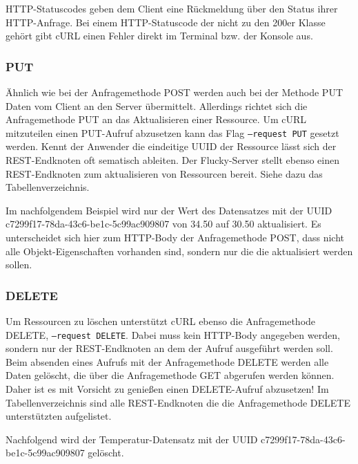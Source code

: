 HTTP-Statuscodes geben dem Client eine Rückmeldung über den Status ihrer HTTP-Anfrage. Bei einem HTTP-Statuscode der nicht zu den 200er Klasse gehört gibt cURL einen Fehler direkt im Terminal bzw. der Konsole aus.

\subsubsection{PUT}%
\label{sec:rest.ansteuern.put}
Ähnlich wie bei der Anfragemethode POST werden auch bei der Methode PUT Daten vom Client an den Server übermittelt. Allerdings richtet sich die Anfragemethode PUT an das Aktualisieren einer Ressource. Um cURL mitzuteilen einen PUT-Aufruf abzusetzen kann das Flag \texttt{--request PUT} gesetzt werden. Kennt der Anwender die eindeitige UUID der Ressource lässt sich der REST-Endknoten oft sematisch ableiten. Der Flucky-Server stellt ebenso einen REST-Endknoten zum aktualisieren von Ressourcen bereit. Siehe dazu das Tabellenverzeichnis.

Im nachfolgendem Beispiel wird nur der Wert des Datensatzes mit der UUID c7299f17-78da-43c6-be1c-5c99ac909807 von 34.50 auf 30.50 aktualisiert. Es unterscheidet sich hier zum HTTP-Body der Anfragemethode POST, dass nicht alle Objekt-Eigenschaften vorhanden sind, sondern nur die die aktualisiert werden sollen.


\subsubsection{DELETE}%
\label{sec:rest.ansteuern.delete}
Um Ressourcen zu löschen unterstützt cURL ebenso die Anfragemethode DELETE, \texttt{--request DELETE}. Dabei muss kein HTTP-Body angegeben werden, sondern nur der REST-Endknoten an dem der Aufruf ausgeführt werden soll. Beim absenden eines Aufrufs mit der Anfragemethode DELETE werden alle Daten gelöscht, die über die Anfragemethode GET abgerufen werden können. Daher ist es mit Vorsicht zu genießen einen DELETE-Aufruf abzusetzen! Im Tabellenverzeichnis sind alle REST-Endknoten die die Anfragemethode DELETE unterstützten aufgelistet.

Nachfolgend wird der Temperatur-Datensatz mit der UUID c7299f17-78da-43c6-be1c-5c99ac909807 gelöscht.


